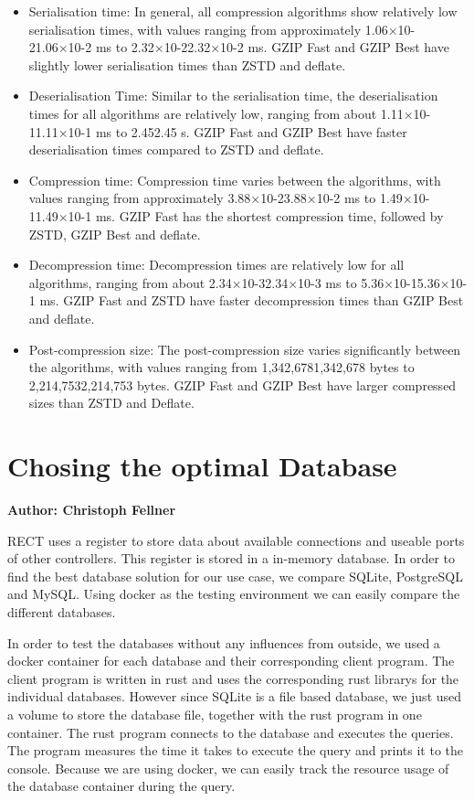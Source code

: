 \begin{itemize}
\item Serialisation time: In general, all compression algorithms show relatively low serialisation times, with values ranging from approximately 1.06×10-21.06×10-2 ms to 2.32×10-22.32×10-2 ms. GZIP Fast and GZIP Best have slightly lower serialisation times than ZSTD and deflate.
\item Deserialisation Time: Similar to the serialisation time, the deserialisation times for all algorithms are relatively low, ranging from about 1.11×10-11.11×10-1 ms to 2.452.45 s. GZIP Fast and GZIP Best have faster deserialisation times compared to ZSTD and deflate.
\item Compression time: Compression time varies between the algorithms, with values ranging from approximately 3.88×10-23.88×10-2 ms to 1.49×10-11.49×10-1 ms. GZIP Fast has the shortest compression time, followed by ZSTD, GZIP Best and deflate.
\item Decompression time: Decompression times are relatively low for all algorithms, ranging from about 2.34×10-32.34×10-3 ms to 5.36×10-15.36×10-1 ms. GZIP Fast and ZSTD have faster decompression times than GZIP Best and deflate.
\item Post-compression size: The post-compression size varies significantly between the algorithms, with values ranging from 1,342,6781,342,678 bytes to 2,214,7532,214,753 bytes. GZIP Fast and GZIP Best have larger compressed sizes than ZSTD and Deflate.
\end{itemize}


\section{Chosing the optimal Database}
\textbf{Author: Christoph Fellner}

RECT uses a register to store data about available connections and useable ports of other controllers. This register is stored in a in-memory database. In order to find the 
best database solution for our use case, we compare SQLite, PostgreSQL and MySQL. Using docker as the testing environment we can easily compare the different databases.\newline

In order to test the databases without any influences from outside, we used a docker container for each database and their corresponding client program. The client program
is written in rust and uses the corresponding rust librarys for the individual databases. However since SQLite is a file based database, we just used a volume to store the
database file, together with the rust program in one container. The rust program connects to the database and executes the queries. The program measures the time it 
takes to execute the query and prints it to the console. Because we are using docker, we can easily track the resource usage of the database container during the query.\newline

